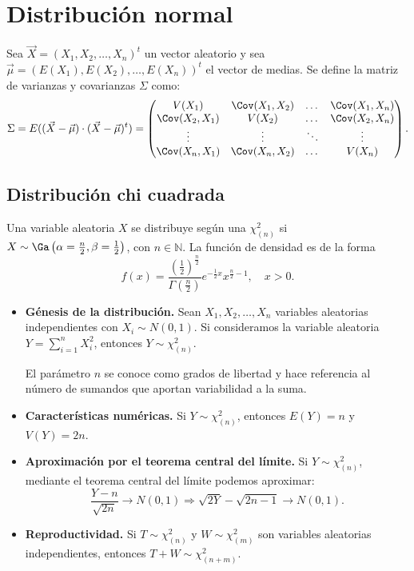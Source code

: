 \chapter{Distribución normal}

\begin{definition}
    Sea $\vec{X} = (X_1, X_2, \dots, X_n)^t$ un vector aleatorio y sea $\vec{\mu} = (E(X_1),E(X_2), \dots,E(X_n))^t$ el vector de medias.
    Se define la matriz de varianzas y covarianzas $\Sigma$ como:
    $$\Sigma = E((\vec{X} - \vec{\mu}) \cdot (\vec{X} - \vec{\mu})^t) = \begin{pmatrix}
            V(X_1)         & \Cov(X_1, X_2) & \dots  & \Cov(X_1, X_n) \\
            \Cov(X_2, X_1) & V(X_2)         & \dots  & \Cov(X_2, X_n) \\
            \vdots         & \vdots         & \ddots & \vdots         \\
            \Cov(X_n, X_1) & \Cov(X_n, X_2) & \dots  & V(X_n)
        \end{pmatrix}.$$
\end{definition}

\section{Distribución chi cuadrada}
\begin{definition}
    Una variable aleatoria $X$ se distribuye según una $\chi_{(n)}^2$ si $X \sim \Ga\left(\alpha = \frac{n}{2}, \beta = \frac{1}{2}\right)$, con $n \in \mathbb{N}$.
    La función de densidad es de la forma
    $$f(x) = \frac{\left(\frac{1}{2}\right)^{\frac{n}{2}}}{\Gamma\left(\frac{n}{2}\right)}e^{-\frac{1}{2}x}x^{\frac{n}{2} -1}, \quad x > 0.$$
\end{definition}

\begin{itemize}
    \item \textbf{Génesis de la distribución.}
          Sean $X_1,X_2, \dots,X_n$ variables aleatorias independientes con $X_i \sim N(0,1)$.
          Si consideramos la variable aleatoria $Y = \sum_{i=1}^n X_i^2$, entonces $Y \sim \chi_{(n)}^2$.

          El parámetro $n$ se conoce como grados de libertad y hace referencia al número de sumandos que aportan variabilidad a la suma.

    \item \textbf{Características numéricas.}
          Si $Y \sim \chi_{(n)}^2$, entonces $E(Y) = n$ y $V(Y) = 2n$.

    \item \textbf{Aproximación por el teorema central del límite.}
          Si $Y \sim \chi_{(n)}^2$, mediante el teorema central del límite podemos aproximar:
          $$\frac{Y - n}{\sqrt{2n}} \longrightarrow N(0,1) \Rightarrow \sqrt{2Y} - \sqrt{2n - 1} \longrightarrow N(0,1).$$

    \item \textbf{Reproductividad.}
          Si $T \sim \chi_{(n)}^2$ y $W \sim \chi_{(m)}^2$ son variables aleatorias independientes, entonces $T + W \sim \chi_{(n+m)}^2$.
\end{itemize}

